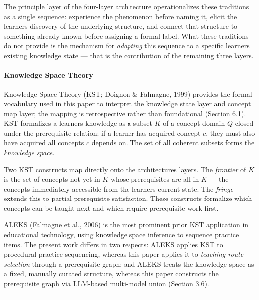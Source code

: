 \documentclass[
]{article}
\begin{document}
The principle layer of the four-layer architecture operationalizes these traditions as a single sequence: experience the phenomenon before naming it, elicit the learner\textquotesingle s discovery of the underlying structure, and connect that structure to something already known before assigning a formal label. What these traditions do not provide is the mechanism for \emph{adapting} this sequence to a specific learner\textquotesingle s existing knowledge state --- that is the contribution of the remaining three layers.

\paragraph{Knowledge Space Theory}\label{knowledge-space-theory}

Knowledge Space Theory (KST; Doignon \& Falmagne, 1999) provides the formal vocabulary used in this paper to interpret the knowledge state layer and concept map layer; the mapping is retrospective rather than foundational (Section 6.1). KST formalizes a learner\textquotesingle s knowledge as a subset \(K\) of a concept domain \(Q\) closed under the prerequisite relation: if a learner has acquired concept \(c\), they must also have acquired all concepts \(c\) depends on. The set of all coherent subsets forms the \emph{knowledge space}.

Two KST constructs map directly onto the architecture\textquotesingle s layers. The \emph{frontier} of \(K\) is the set of concepts not yet in \(K\) whose prerequisites are all in \(K\) --- the concepts immediately accessible from the learner\textquotesingle s current state. The \emph{fringe} extends this to partial prerequisite satisfaction. These constructs formalize which concepts can be taught next and which require prerequisite work first.

ALEKS (Falmagne et al., 2006) is the most prominent prior KST application in educational technology, using knowledge space inference to sequence practice items. The present work differs in two respects: ALEKS applies KST to procedural practice sequencing, whereas this paper applies it to \emph{teaching route selection} through a prerequisite graph; and ALEKS treats the knowledge space as a fixed, manually curated structure, whereas this paper constructs the prerequisite graph via LLM-based multi-model union (Section 3.6).

\begin{center}\rule{0.5\linewidth}{0.5pt}\end{center}
\end{document}
